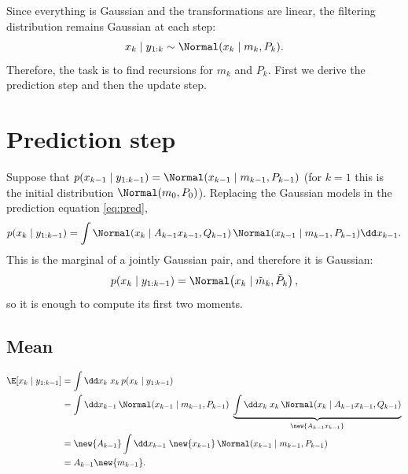 Since everything is Gaussian and the transformations are linear, the filtering distribution remains Gaussian at each step:
\begin{equation}
  x_k \mid y_{1:k} \sim \Normal(x_k \mid m_k, P_k).
\end{equation}
Therefore, the task is to find recursions for $m_k$ and $P_k$. First we derive the prediction step and then the update step.

\section{Prediction step}
Suppose that $p(x_{k-1} \mid y_{1:k-1}) = \Normal(x_{k-1} \mid m_{k-1}, P_{k-1})$ (for $k=1$ this is the initial distribution $\Normal(m_0, P_0)$). Replacing the Gaussian models in the prediction equation \eqref{eq:pred},
\begin{equation}
  p(x_k \mid y_{1:k-1}) = \int \Normal(x_k \mid A_{k-1}x_{k-1}, Q_{k-1})\, \Normal(x_{k-1} \mid m_{k-1}, P_{k-1}) \dd x_{k-1}.
\end{equation}
This is the marginal of a jointly Gaussian pair, and therefore it is Gaussian:
\begin{equation}
  p(x_k \mid y_{1:k-1}) = \Normal\!\left(x_k \mid \mt_k, \Pt_k\right), \label{eq:predgauss}
\end{equation}
so it is enough to compute its first two moments.

\subsection{Mean}
\begin{equation}
  \begin{aligned}
  \E[x_k \mid y_{1:k-1}] &= \int \dd x_k\; x_k\, p(x_k \mid y_{1:k-1}) \\
  &= \int \dd x_{k-1}\, \Normal(x_{k-1} \mid m_{k-1}, P_{k-1})\; \underbrace{\int \dd x_k\; x_k\, \Normal(x_k \mid A_{k-1}x_{k-1}, Q_{k-1})}_{\new{A_{k-1}x_{k-1}}} \\
  &= \new{A_{k-1}}\int \dd x_{k-1}\; \new{x_{k-1}}\, \Normal(x_{k-1} \mid m_{k-1}, P_{k-1}) \\
  &= A_{k-1} \new{m_{k-1}}.
  \end{aligned}
\end{equation}

